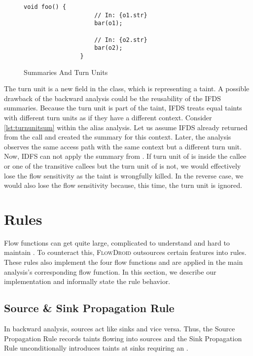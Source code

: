 \documentclass[../draft.tex]{subfiles}
\begin{document}
    \begin{figure}[tbp]
        \centering
        \begin{adjustbox}{max width=\columnwidth}
            \begin{lstlisting}[gobble=16]
                void foo() {
                    // In: {o1.str}
                    bar(o1);

                    // In: {o2.str}
                    bar(o2);
                }
            \end{lstlisting}
        \end{adjustbox}
        \caption{Summaries And Turn Units}
        \label{lst:turnunitsum}
    \end{figure}

    The turn unit is a new field in the  class, which is representing a taint.
    A possible drawback of the backward analysis could be the reusability of the IFDS summaries.
    Because the turn unit is part of the taint, IFDS treats equal taints with different turn units as if they have a different context.
    Consider \autoref{lst:turnunitsum} within the alias analysis.
    Let us assume IFDS already returned from the call  and created the summary for this context.
    Later, the analysis observes the same access path with the same context but a different turn unit.
    Now, IDFS can not apply the summary from .
    If turn unit of  is inside the callee or one of the transitive callees but the turn unit of  is not, we would effectively lose the flow sensitivity as the taint is wrongfully killed.
    In the reverse case, we would also lose the flow sensitivity because, this time, the turn unit is ignored.

    \section{Rules}\label{s:rules}
    Flow functions can get quite large, complicated to understand and hard to maintain \cite{Lerch2015}.
    To counteract this, \textsc{FlowDroid} outsources certain features into rules.
    These rules also implement the four flow functions and are applied in the main analysis's corresponding flow function.
    In this section, we describe our implementation and informally state the rule behavior.

    \subsection{Source \& Sink Propagation Rule}\label{s:sourcerule}
    In backward analysis, sources act like sinks and vice versa.
    Thus, the Source Propagation Rule records taints flowing into sources and the Sink Propagation Rule unconditionally introduces taints at sinks requiring an .
\end{document}

